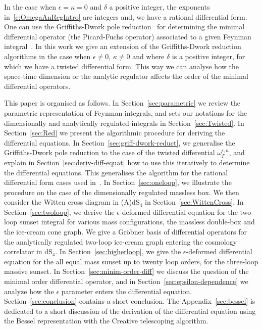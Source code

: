 \documentclass[a4paper,12pt]{article}
\numberwithin{equation}{section}
\numberwithin{figure}{section}
\begin{document}
In the case when $\epsilon=\kappa=0$ and $\delta$ a positive integer, the exponents
in~\eqref{e:OmegaAnRegIntro} are
integers and,
we have a rational differential form. One can use the  Griffiths-Dwork
pole reduction~\cite{Griffiths_1969,Griffith1,Griffith2,Dwork_1962,Dwork_1964} for determining the minimal differential operator (the
Picard-Fuchs operator) associated to a given Feynman
integral~\cite{Bloch:2016izu,Vanhove:2018mto,Lairez:2022zkj}.
In this work we give an extension of the Griffiths-Dwork reduction  algorithms in the case when
$\epsilon\neq0$, $\kappa\neq0$ and where $\delta$ is a positive
integer, for which   we have a twisted differential
form.
%
 This way we
can analyse how the space-time dimension or the analytic regulator  affects the order of the
minimal differential operators.



This paper is organised as follows. 
In Section~\ref{sec:parametric} we review the parametric
representation of Feynman integrals, and sets our notations for the 
dimensionally and analytically regulated integrals in Section~\ref{sec:Twisted}.
In Section~\ref{sec:Red} we
present the algorithmic procedure for deriving the differential
equations. In Section~\ref{sec:griff-dwork-reduct},  we generalise the
Griffiths-Dwork pole reduction to the case of the twisted differential
$\omega_\Gamma^{\epsilon,\kappa}$, and explain in
Section~\ref{sec:deriv-diff-equat} how to use this iteratively to
determine the differential equations. This generalises the algorithm  for the rational differential form cases
used in~\cite{Lairez:2022zkj}. In Section~\ref{sec:oneloop}, we
illustrate the procedure on the case of the dimensionally regulated massless box.
We then consider the Witten cross diagram in (A)dS$_4$ in Section~\ref{sec:WittenCross}.
In
Section~\ref{sec:twoloop}, we derive the $\epsilon$-deformed
differential equation for the two-loop sunset integral for various
mass configurations, the massless double-box and the ice-cream cone
graph. We give a Gr\"obner basis of differential operators for the
analytically regulated
two-loop ice-cream graph entering the cosmology correlator in dS$_4$. In Section~\ref{sec:higherloop}, we give the $\epsilon$-deformed
differential
equation for the all equal mass sunset up to twenty loop orders, for
the three-loop massive sunset.
In Section~\ref{sec:minim-order-diff}
we discuss the question of the minimal order differential operator,
and in Section~\ref{sec:epsilon-dependence} we analyze how the
$\epsilon$ parameter enters the differential
equation. Section~\ref{sec:conclusion} contains a short
conclusion. The Appendix~\ref{sec:bessel} is dedicated to a short
discussion of the derivation of the differential equation using the
Bessel representation with the Creative telescoping algorithm.
\end{document}
